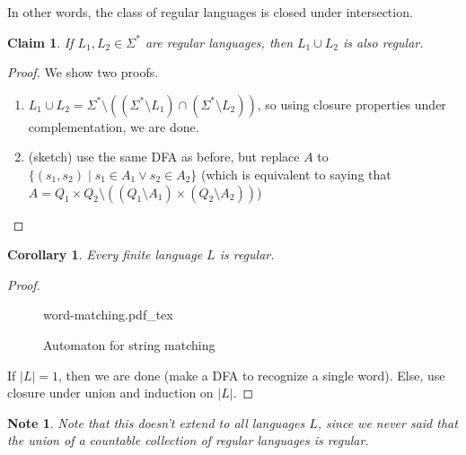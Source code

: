 \documentclass[a4paper]{article}
\newtheorem{claim}{Claim}
\newtheorem{cor}{Corollary}
\newtheorem{note}{Note}
\newcommand{\incfig}[1]{%
    \def\svgwidth{0.9\columnwidth}
    {#1.pdf_tex}
}
\begin{document}
In other words, the class of regular languages is closed under intersection.

\begin{claim}
If $L_1, L_2 \in \Sigma^*$ are regular languages, then $L_1 \cup L_2$ is also regular. 
\end{claim}

\begin{proof}
    We show two proofs.
    \begin{enumerate}
        \item $L_1 \cup L_2 = \Sigma^* \setminus ((\Sigma^* \setminus L_1) \cap (\Sigma^* \setminus L_2))$, so using closure properties under complementation, we are done.
        \item (sketch) use the same DFA as before, but replace $A$ to $\{(s_1, s_2) \mid s_1 \in A_1 \lor s_2 \in A_2\}$ (which is equivalent to saying that $A = Q_1 \times Q_2 \setminus ((Q_1
            \setminus A_1)
            \times (Q_2 \setminus A_2))$)
    \end{enumerate}
\end{proof}

\begin{cor}
    Every finite language $L$ is regular.
\end{cor}
\begin{proof}

\begin{figure}[h]
    \centering
    \incfig{word-matching}
    \caption{Automaton for string matching}
    \label{fig:word-matching}
\end{figure}
    If $|L| = 1$, then we are done (make a DFA to recognize a single word).
    Else, use closure under union and induction on $|L|$.
\end{proof}
\begin{note}
    Note that this doesn't extend to all languages $L$, since we never said that the union of a countable collection of regular languages is regular.
\end{note}
\end{document}
